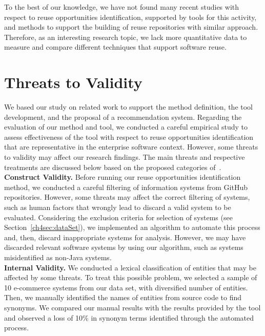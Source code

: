 To the best of our knowledge, we have not found many recent studies with respect to reuse opportunities identification, supported by tools for this activity, and methods to support the building of reuse repositories with similar approach. Therefore, as an interesting research topic, we lack more quantitative data to measure and compare different techniques that support software reuse.




\section{Threats to Validity}
\label{sec:tv}

We based our study on related work to support the method definition, the tool development, and the proposal of a recommendation system. Regarding the evaluation of our method and  tool, we conducted a careful empirical study to assess effectiveness of the tool with respect to reuse opportunities identification that are representative in the enterprise software context. However, some threats to validity may affect our research findings. The main threats and respective treatments are discussed below based on the proposed categories of~\cite{wohlin2012experimentation}. \\



\noindent
\textbf{Construct Validity.} Before running our reuse opportunities identification method, we conducted a careful filtering of information systems from GitHub repositories. However, some threats may affect the correct filtering of systems, such as human factors that wrongly lead to discard a valid system to be evaluated. Considering the exclusion criteria for selection of systems (see Section~\ref{ch4sec:dataSet}), we implemented an algorithm to automate this process and, then, discard inappropriate systems for analysis. However, we may have discarded relevant software systems by using our algorithm, such as systems misidentified as non-Java systems. \\


\noindent
\textbf{Internal Validity.} We conducted a lexical classification of entities that may be affected by some threats. To treat this possible problem, we selected a sample of 10 e-commerce systems from our data set, with diversified number of entities. Then, we manually identified the names of entities from source code to find synonyms. We compared our manual results with the results provided by the tool and observed a loss of 10\% in synonym terms identified through the automated process. \\

